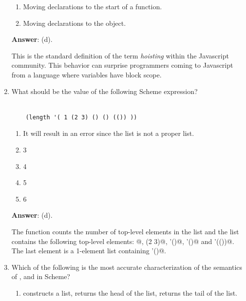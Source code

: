 \documentclass[12pt]{article}
\begin{document}
\begin{enumerate}
\begin{enumerate}
\item Moving \verb@var@ declarations to the start
  of a function.

\item Moving \verb@var@ declarations to the \verb@window@ object.

\end{enumerate}

\textbf{Answer}: (d).

This is the standard definition of the term \textit{hoisting} within
the Javascript community.  This behavior can surprise programmers
coming to Javascript from a language where variables have block scope.


\item What should be the value of the following Scheme expression?

\begin{verbatim}

    (length '( 1 (2 3) () () (()) ))

 \end{verbatim}


\begin{enumerate}

\item It will result in an error since the list is not a proper list.
  
\item 3

\item 4 
  
\item 5
  
\item 6
    
\end{enumerate}

\textbf{Answer}: (d).

The \verb@length@ function counts the number of top-level elements in
 the list and the list contains the following top-level elements:
@, \verb@(2 3)@, \verb@'()@, \verb@'()@ and \verb@'(())@.  The 
last element is a 1-element list containing \verb@'()@.

\item Which of the following is the most accurate characterization of
 the semantics of \verb@cons@, \verb@car@ and \verb@cdr@ in
 Scheme?

\begin{enumerate}

\item \verb@cons@ constructs a list, \verb@car@ returns the head
of the list, \verb@cdr@ returns the tail of the list.


\end{enumerate}
\end{enumerate}
\end{document}
